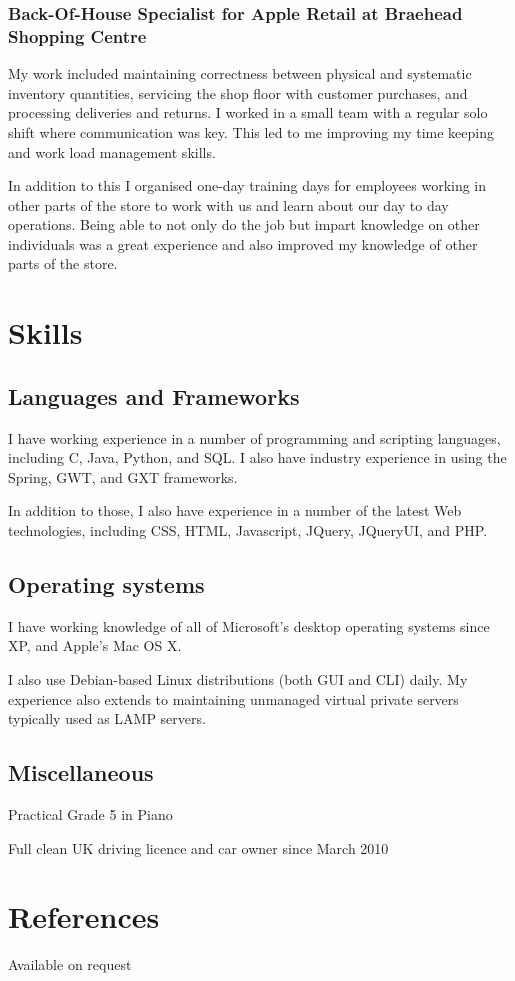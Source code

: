 \documentclass[11pt,a4paper]{article}
\begin{document}
\subsubsection*{Back-Of-House Specialist for Apple Retail at Braehead
Shopping Centre}

My work included maintaining correctness between physical and systematic
inventory quantities, servicing the shop floor with customer purchases, and
processing deliveries and returns. I worked in a small team with a regular
solo shift where communication was key. This led to me improving my time
keeping and work load management skills.

In addition to this I organised one-day training days for employees working in
other parts of the store to work with us and learn about our day to day
operations. Being able to not only do the job but impart knowledge on other
individuals was a great experience and also improved my knowledge of other
parts of the store.

\section*{Skills}

\subsection*{Languages and Frameworks}

I have working experience in a number of programming and scripting languages,
including C, Java, Python, and SQL. I also have industry experience in using
the Spring, GWT, and GXT frameworks.

In addition to those, I also have experience in a number of the latest Web
technologies, including CSS, HTML, Javascript, JQuery, JQueryUI, and PHP.

\subsection*{Operating systems}

I have working knowledge of all of Microsoft's desktop operating systems since
XP, and Apple's Mac OS X.

I also use Debian-based Linux distributions (both GUI and CLI) daily. My
experience also extends to maintaining unmanaged virtual private servers
typically used as LAMP servers.

\subsection*{Miscellaneous}

Practical Grade 5 in Piano

Full clean UK driving licence and car owner since March 2010

\section*{References}

Available on request
\end{document}
